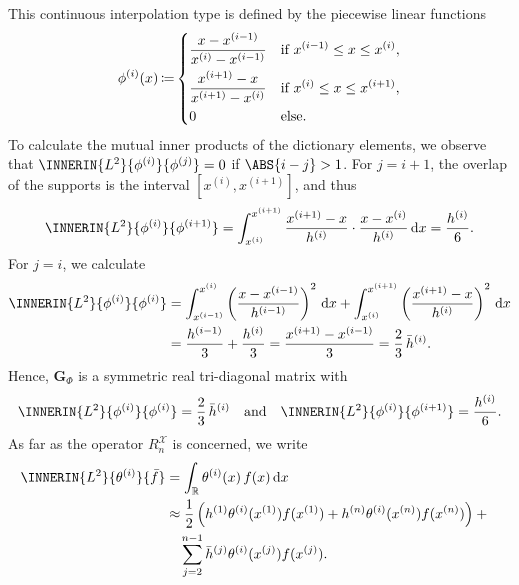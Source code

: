 \documentclass[a4paper]{paper}
\newcommand*{\SPC}[1]{{\ensuremath{\mathscr{#1}}}}
\newcommand{\RR}{{\ensuremath{\mathbb{R}}}}
\newcommand*{\REST}[2]{\ensuremath{R_{#1}^{#2}}}
\newcommand*{\RnX}{{\ensuremath{\REST{n}{\SPC{X}}}}}
\DeclareMathOperator{\DEFEQ}{{\coloneqq}}
\newcommand*{\D}[0]{\ensuremath{\mathrm{d}}}
\newcommand*{\IDX}[2]{{\ensuremath{{#2}^{(#1)}}}}
\newcommand{\vG}{\boldsymbol{G}}
\begin{document}
This continuous interpolation type is defined by the piecewise linear functions 
%
\begin{equation*}
 \IDX{i}{\phi}(x) \DEFEQ
 \begin{dcases}
  \frac{x - \IDX{i-1}{x}}{\IDX{i}{x} - \IDX{i-1}{x}} & \text{if } \IDX{i-1}{x} \leq x \leq \IDX{i}{x}, \\
  \frac{\IDX{i+1}{x} - x}{\IDX{i+1}{x} - \IDX{i}{x}} & \text{if } \IDX{i}{x} \leq x \leq \IDX{i+1}{x}, \\
  0 & \text{else}.
 \end{dcases}
\end{equation*}
%
To calculate the mutual inner products of the dictionary elements, we observe that 
$\INNERIN{L^2}{\IDX{i}{\phi}}{\IDX{j}{\phi}} = 0$ if $\ABS{i-j} > 1$. For $j=i+1$, the overlap of the supports is the 
interval ${[\IDX{i}{x}, \IDX{i+1}{x}]}$, and thus
%
\begin{equation*}
 \INNERIN{L^2}{\IDX{i}{\phi}}{\IDX{i+1}{\phi}}
 = \int_\IDX{i}{x}^\IDX{i+1}{x} \frac{\IDX{i+1}{x} - x}{\IDX{i}{h}} \cdot \frac{x - \IDX{i}{x}}{\IDX{i}{h}}\, \D x
 = \frac{\IDX{i}{h}}{6}.
\end{equation*}
%
For $j=i$, we calculate
%
\begin{align*}
 \INNERIN{L^2}{\IDX{i}{\phi}}{\IDX{i}{\phi}}
 &= \int_\IDX{i-1}{x}^\IDX{i}{x} \left( \frac{x - \IDX{i-1}{x}}{\IDX{i-1}{h}} \right)^2\, \D x +
 \int_\IDX{i}{x}^\IDX{i+1}{x} \left( \frac{\IDX{i+1}{x} - x}{\IDX{i}{h}} \right)^2\, \D x \\
 &= \frac{\IDX{i-1}{h}}{3} + \frac{\IDX{i}{h}}{3} 
 = \frac{\IDX{i+1}{x} - \IDX{i-1}{x}}{3}
 = \frac{2}{3}\, \IDX{i}{\bar h}.
\end{align*}
%
Hence, $\vG_\Phi$ is a symmetric real tri-diagonal matrix with
%
\begin{equation*}
 \INNERIN{L^2}{\IDX{i}{\phi}}{\IDX{i}{\phi}} = \frac{2}{3}\, \IDX{i}{\bar h}
 \quad \text{and} \quad
 \INNERIN{L^2}{\IDX{i}{\phi}}{\IDX{i+1}{\phi}} = \frac{\IDX{i}{h}}{6}.
\end{equation*}
%
As far as the operator $\RnX$ is concerned, we write
%
\begin{align*}
 \INNERIN{L^2}{\IDX{i}{\theta}}{\bar f}
 &= \int_\RR \IDX{i}{\theta}(x)\, f(x)\, \D x \\
 & \approx \frac{1}{2}\left(
 \IDX{1}{h} \IDX{i}{\theta}(\IDX{1}{x}) f(\IDX{1}{x}) + \IDX{n}{h} \IDX{i}{\theta}(\IDX{n}{x}) f(\IDX{n}{x})  
 \right) + \phantom{x} \\
 &\hspace{10pt} \sum_{j=2}^{n-1} \IDX{j}{\bar h} \IDX{i}{\theta}(\IDX{j}{x}) f(\IDX{j}{x}).
\end{align*}
\end{document}
